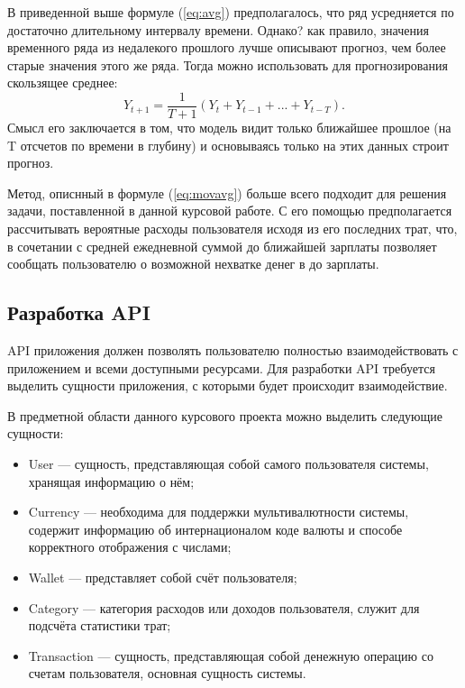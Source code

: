 В приведенной выше формуле (\ref{eq:avg}) предполагалось, что ряд усредняется по достаточно длительному 
интервалу времени. Однако? как правило, значения временного ряда из недалекого прошлого лучше описывают 
прогноз, чем более старые значения этого же ряда. Тогда можно использовать для прогнозирования скользящее среднее:
\begin{equation} 
Y_{t+1}=\frac{1}{T+1}(Y_t+Y_{t-1}+...+Y_{t-T}). \label{eq:movavg}
\end{equation}
Смысл его заключается в том, что модель видит только ближайшее прошлое (на T отсчетов по времени в глубину) 
и основываясь только на этих данных строит прогноз.

Метод, описнный в формуле (\ref{eq:movavg}) больше всего подходит для решения задачи, поставленной в данной 
курсовой работе. С его помощью предполагается рассчитывать вероятные расходы пользователя исходя из его последних трат, 
что, в сочетании с средней ежедневной суммой до ближайшей зарплаты позволяет сообщать пользователю о возможной нехватке 
денег в до зарплаты.

\subsection{Разработка API}
\label{sec:api}

API приложения должен позволять пользователю полностью взаимодействовать с приложением и всеми доступными 
ресурсами. Для разработки API требуется выделить сущности приложения, с которыми будет происходит взаимодействие.

В предметной области данного курсового проекта можно выделить следующие сущности:
\begin{itemize}
  \item User --- сущность, представляющая собой самого пользователя системы, хранящая информацию о нём;
  \item Currency --- необходима для поддержки мультивалютности системы, содержит информацию об интернационалом 
  коде валюты и способе корректного отображения с числами;
  \item Wallet --- представляет собой счёт пользователя;
  \item Category --- категория расходов или доходов пользователя, служит для подсчёта статистики трат;
  \item Transaction --- сущность, представляющая собой денежную операцию со счетам пользователя, основная 
  сущность системы.
\end{itemize}

